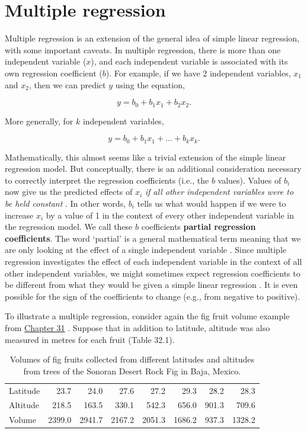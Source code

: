 \documentclass[
]{scrbook}
\begin{document}
\hypertarget{Chapter_32}{%
\chapter{Multiple regression}\label{Chapter_32}}

Multiple regression is an extension of the general idea of simple linear regression, with some important caveats.
In multiple regression, there is more than one independent variable (\(x\)), and each independent variable is associated with its own regression coefficient (\(b\)).
For example, if we have 2 independent variables, \(x_{1}\) and \(x_{2}\), then we can predict \(y\) using the equation,

\[y = b_{0} + b_{1}x_{1} + b_{2}x_{2}.\]

More generally, for \(k\) independent variables,

\[y = b_{0} + b_{1}x_{1} + ... + b_{k}x_{k}.\]

Mathematically, this almost seems like a trivial extension of the simple linear regression model.
But conceptually, there is an additional consideration necessary to correctly interpret the regression coefficients (i.e., the \(b\) values).
Values of \(b_{i}\) now give us the predicted effects of \(x_{i}\) \emph{if all other independent variables were to be held constant} \citep{Sokal1995}.
In other words, \(b_{i}\) tells us what would happen if we were to increase \(x_{i}\) by a value of 1 in the context of every other independent variable in the regression model.
We call these \(b\) coefficients \textbf{partial regression coefficients}.
The word `partial' is a general mathematical term meaning that we are only looking at the effect of a single independent variable \citep{Borowski2005}.
Since multiple regression investigates the effect of each independent variable in the context of all other independent variables, we might sometimes expect regression coefficients to be different from what they would be given a simple linear regression \citep{Morrissey2018}.
It is even possible for the sign of the coefficients to change (e.g., from negative to positive).

To illustrate a multiple regression, consider again the fig fruit volume example from \protect\hyperlink{Chapter_31}{Chapter 31} \citep{Duthie2016}.
Suppose that in addition to latitude, altitude was also measured in metres for each fruit (Table 32.1).

\begin{longtable}[]{@{}lrrrrrrr@{}}
\caption{\label{tab:unnamed-chunk-170}Volumes of fig fruits collected from different latitudes and altitudes from trees of the Sonoran Desert Rock Fig in Baja, Mexico.}\tabularnewline
\toprule
\endhead
Latitude & 23.7 & 24.0 & 27.6 & 27.2 & 29.3 & 28.2 & 28.3 \\
Altitude & 218.5 & 163.5 & 330.1 & 542.3 & 656.0 & 901.3 & 709.6 \\
Volume & 2399.0 & 2941.7 & 2167.2 & 2051.3 & 1686.2 & 937.3 & 1328.2 \\
\bottomrule
\end{longtable}
\end{document}

